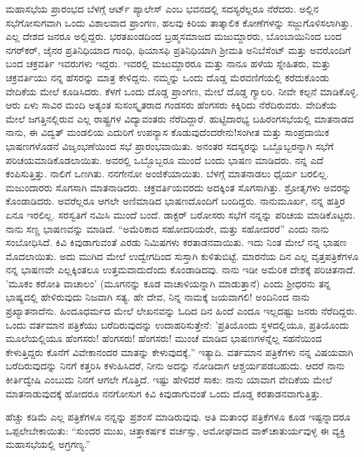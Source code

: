 ಮಹಾಸಭೆಯ ಪ್ರಾರಂಭದ ಬೆಳಗ್ಗೆ ಆರ್ಟ್ ಪ್ಯಾಲೇಸ್ ಎಂಬ ಭವನದಲ್ಲಿ ಸದಸ್ಯರೆಲ್ಲರೂ ನೆರೆದರು. ಅಲ್ಲಿನ ಸಭೆಗೋಸುಗವಾಗಿ ಒಂದು ವಿಶಾಲವಾದ ಪ್ರಾಂಗಣ, ಹಲವು ಕಿರಿಯ ತಾತ್ಕಾಲಿಕ ಕೋಣೆಗಳನ್ನು ಸಜ್ಜುಗೊಳಿಸಲಾಗಿತ್ತು. ಎಲ್ಲ ದೇಶದ ಜನರೂ ಅಲ್ಲಿದ್ದರು. ಭರತಖಂಡದಿಂದ ಬ್ರಹ್ಮಸಮಾಜದ ಮಜುಮ್ದಾರರು, ಬೊಂಬಾಯಿನಿಂದ ಬಂದ ನಗರ್‌ಕರ್‌, ಜೈನರ ಪ್ರತಿನಿಧಿಯಾದ ಗಾಂಧಿ, ಥಿಯಾಸಫಿ ಪ್ರತಿನಿಧಿಯಾಗಿ ಶ‍್ರೀಮತಿ ಅನಿಬೆಸೆಂಟ್ ಮತ್ತು ಅವರೊಂದಿಗೆ ಬಂದ ಚಕ್ರವರ್ತಿ ಇವರುಗಳು ಇದ್ದರು. ಇವರಲ್ಲಿ ಮಜುಮ್ದಾರರೂ ಮತ್ತು ನಾನೂ ಹಳೆಯ ಸ್ನೇಹಿತರು, ಮತ್ತು ಚಕ್ರವರ್ತಿಯು ನನ್ನ ಹೆಸರನ್ನು ಮಾತ್ರ ಕೇಳಿದ್ದನು. ನಮ್ಮನ್ನು ಒಂದು ದೊಡ್ಡ ಮೆರವಣಿಗೆಯಲ್ಲಿ ಕರೆದುಕೊಂಡು ವೇದಿಕೆಯ ಮೇಲೆ ಕೂಡಿಸಿದರು. ಕೆಳಗೆ ಒಂದು ದೊಡ್ಡ ಪ್ರಾಂಗಣ, ಮೇಲೆ ದೊಡ್ಡ ಗ್ಯಾಲರಿ. ನೀವೇ ಕಲ್ಪನೆ ಮಾಡಿಕೊಳ್ಳಿ. ಆರು ಏಳು ಸಾವಿರ ಮಂದಿ ಅತ್ಯಂತ ಸುಸಂಸ್ಕೃತರಾದ ಗಂಡಸರು ಹೆಂಗಸರು ಕಿಕ್ಕಿರಿದು ನೆರೆದಿರುವರು. ವೇದಿಕೆಯ ಮೇಲೆ ಜಗತ್ತಿನಲ್ಲಿರುವ ಎಲ್ಲ ರಾಷ್ಟ್ರಗಳ ವಿದ್ಯಾವಂತರು ನೆರೆದಿದ್ದಾರೆ. ಹುಟ್ಟಿದಾರಭ್ಯ ಬಹಿರಂಗಸಭೆಯಲ್ಲಿ ಮಾತನಾಡದ ನಾನು, ಈ ವಿದ್ವತ್ ಮಂಡಲಿಯ ಎದುರಿಗೆ ಉಪನ್ಯಾಸ ಕೊಡುವುದೆಂದರೇನು!ಸಂಗೀತ ಮತ್ತು ಸಾಂಪ್ರದಾಯಿಕ ಭಾಷಣಗಳೊಡನೆ ವಿಜೃಂಭಣೆಯಿಂದ ಸಭೆ ಪ್ರಾರಂಭವಾಯಿತು. ಅನಂತರ ಸದಸ್ಯರನ್ನು ಒಬ್ಬೊಬ್ಬರನ್ನಾಗಿ ಸಭೆಗೆ ಪರಿಚಯಮಾಡಿಕೊಡಲಾಯಿತು. ಅವರಲ್ಲಿ ಒಬ್ಬೊಬ್ಬರೂ ಮುಂದೆ ಬಂದು ಭಾಷಣ ಮಾಡಿದರು. ನನ್ನ ಎದೆ ಕಂಪಿಸುತ್ತಿತ್ತು. ನಾಲಿಗೆ ಒಣಗಿತು. ನನಗೇನೋ ಅಂಜಿಕೆಯಾಯಿತು. ಬೆಳಗ್ಗೆ ಮಾತನಾಡಲು ಧೈರ್ಯ ಬರಲಿಲ್ಲ. ಮಜುಂದಾರರು ಸೊಗಸಾಗಿ ಮಾತನಾಡಿದರು. ಚಕ್ರವರ್ತಿಯವರದು ಅದಕ್ಕಿಂತ ಸೊಗಸಾಗಿತ್ತು. ಶ್ರೋತೃಗಳು ಅವರನ್ನು ಕೊಂಡಾಡಿದರು. ಅವರೆಲ್ಲರೂ ಆಗಲೇ ಅಣಿಮಾಡಿದ ಭಾಷಣದೊಂದಿಗೆ ಬಂದಿದ್ದರು. ನಾನುಮೂರ್ಖ, ನನ್ನ ಹತ್ತಿರ ಏನೂ ಇರಲಿಲ್ಲ. ಸರಸ್ವತಿಗೆ ನಮಿಸಿ ಮುಂದೆ ಬಂದೆ. ಡಾಕ್ಟರ್ ಬರೋಸರು ಸಭೆಗೆ ನನ್ನನ್ನು ಪರಿಚಯ ಮಾಡಿಕೊಟ್ಟರು. ನಾನು ಸಣ್ಣ ಭಾಷಣವನ್ನು ಮಾಡಿದೆ. “ಅಮೆರಿಕಾದ ಸಹೋದರಿಯರೇ, ಮತ್ತು ಸಹೋದರರೆ” ಎಂದು ನಾನು ಸಂಬೋಧಿಸಿದೆ. ಕಿವಿ ಕಿವುಡಾಗುವಂತೆ ಎರಡು ನಿಮಿಷಗಳು ಕರತಾಡನವಾಯಿತು. ಇದು ನಿಂತ ಮೇಲೆ ನನ್ನ ಭಾಷಣ ಮೊದಲಾಯಿತು. ಅದು ಮುಗಿದ ಮೇಲೆ ಉದ್ವೇಗದಿಂದ ಸುಸ್ತಾಗಿ ಕುಳಿತುಬಿಟ್ಟೆ. ಮಾರನೆಯ ದಿನ ಎಲ್ಲ ವೃತ್ತಪತ್ರಿಕೆಗಳೂ ನನ್ನ ಭಾಷಣವೇ ಎಲ್ಲಕ್ಕಿಂತಲೂ ಉತ್ತಮವಾದುದೆಂದು ಕೊಂಡಾಡಿದವು. ನಾನು ಇಡೀ ಅಮೆರಿಕ ದೇಶಕ್ಕೆ ಪರಿಚಿತನಾದೆ. ’ಮೂಕಂ ಕರೋತಿ ವಾಚಾಲಂ’ (ಮೂಗನನ್ನು ಕೂಡ ವಾಚಾಳಿಯನ್ನಾಗಿ ಮಾಡುತ್ತಾನೆ) ಎಂದು ಶ‍್ರೀಧರನು ತನ್ನ ಭಾಷ್ಯದಲ್ಲಿ ಹೇಳಿರುವುದು ನಿಜವಾಗಿ ಸತ್ಯ. ಹೇ ದೇವ, ನಿನ್ನ ನಾಮಕ್ಕೆ ಜಯವಾಗಲಿ! ಅಂದಿನಿಂದ ನಾನು ಪ್ರಖ್ಯಾತನಾದೆನು. ಹಿಂದೂಧರ್ಮದ ಮೇಲೆ ಲೇಖನವನ್ನು ಓದಿದ ದಿನ ಹಿಂದೆ ಎಂದೂ ಇಲ್ಲದಷ್ಟು ಜನರು ನೆರೆದಿದ್ದರು. ಒಂದು ವರ್ತಮಾನ ಪತ್ರಿಕೆಯು ಬರೆದಿರುವುದನ್ನು ಉದಾಹರಿಸುತ್ತೇನೆ: ’ಪ್ರತಿಯೊಂದು ಸ್ಥಳದಲ್ಲಿಯೂ, ಪ್ರತಿಯೊಂದು ಮೂಲೆಯಲ್ಲಿಯೂ ಹೆಂಗಸರು! ಹೆಂಗಸರು! ಹೆಂಗಸರು! ಮುಂಚೆ ಮಾಡಿದ ಭಾಷಣಗಳನ್ನೆಲ್ಲ ಸಹನೆಯಿಂದ ಕೇಳುತ್ತಿದ್ದರು \enginline{-} ಕೊನೆಗೆ ವಿವೇಕಾನಂದರ ಮಾತನ್ನು ಕೇಳುವುದಕ್ಕೆ,” ಇತ್ಯಾದಿ. ವರ್ತಮಾನ ಪತ್ರಿಕೆಗಳು ನನ್ನ ವಿಷಯವಾಗಿ ಬರೆದಿರುವುದನ್ನು ನಿನಗೆ ಕತ್ತರಿಸಿ ಕಳುಹಿಸಿದರೆ, ನೀನು ಅದನ್ನು ನೋಡಿದಾಗ ಆಶ್ಚರ್ಯಪಡಬಹುದು. ಆದರೆ ನಾನು ಕೀರ್ತಿದ್ವೇಷಿ ಎಂಬುದು ನಿನಗೆ ಆಗಲೇ ಗೊತ್ತಿದೆ. ಇಷ್ಟು ಹೇಳಿದರೆ ಸಾಕು: ನಾನು ಯಾವಾಗ ವೇದಿಕೆಯ ಮೇಲೆ ಮಾತನಾಡುವುದಕ್ಕೆ ಹೋದರೂ ನನಗೋಸುಗ ಕಿವಿ ಕಿವುಡಾಗುವಂತೆ ಒಂದು ದೊಡ್ಡ ಕರತಾಡನವಾಗುತ್ತಿತ್ತು.

ಹೆಚ್ಚು ಕಡಿಮೆ ಎಲ್ಲ ಪತ್ರಿಕೆಗಳೂ ನನ್ನನ್ನು ಪ್ರಶಂಸೆ ಮಾಡಿರುವುವು. ಅತಿ ಮತಾಂಧ ಪತ್ರಿಕೆಗಳೂ ಕೂಡ ಇಷ್ಟನ್ನಾದರೂ ಒಪ್ಪಲೇಬೇಕಾಯಿತು: “ಸುಂದರ ಮುಖ, ಚಿತ್ತಾಕರ್ಷಕ ವರ್ಚಸ್ಸು, ಅಮೋಘವಾದ ವಾಕ್‌ಚಾತುರ್ಯವುಳ್ಳ ಈ ವ್ಯಕ್ತಿ ಮಹಾಸಭೆಯಲ್ಲಿ ಅಗ್ರಗಣ್ಯ.”

